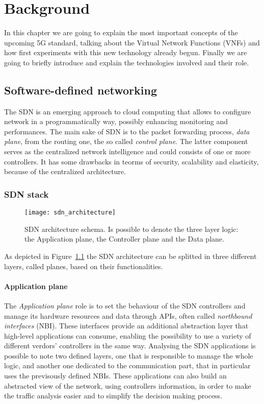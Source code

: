 \chapter{Background}
\label{chap:background}

In this chapter we are going to explain the most important concepts of the 
upcoming 5G standard, talking about the Virtual Network Functions (VNFs) and 
how first experiments with this new technology already begun. Finally we are 
going to briefly introduce and explain the technologies involved and their role.

\section{Software-defined networking}
The SDN is an emerging approach to cloud computing that allows to configure
network in a programmatically way, possibly enhancing monitoring and
performances. The main sake of SDN is to the packet forwarding process,
\emph{data plane}, from the routing one, the so called \emph{control plane}.
The latter component serves as the centralized network intelligence and could
consists of one or more controllers. It has some drawbacks in teorms of
security, scalability and elasticity, because of the centralized architecture.

\subsection{SDN stack}
\begin{figure}[t]
 \centering
 \texttt{[image: sdn\_architecture]}
 \caption[SDN architecture schema]{SDN architecture schema. Is possible to 
denote the three layer logic: the Application plane, the Controller plane and 
the Data plane.}
 \label{chap:background:img:sdn_architecture}
\end{figure}
As depicted in Figure~\ref{chap:background:img:sdn_architecture} the SDN
architecture can be splitted in three different layers, called planes, based on 
their functionalities. 

\subsubsection{Application plane}

The \emph{Application plane} role is to set the behaviour of the SDN controllers 
and manage its hardware resources and data through APIs, often called 
\emph{northbound interfaces} (NBI).
These interfaces provide an additional abstraction layer that high-level 
applications can consume, enabling the possibility to use a variety of 
different verdors' controllers in the same way.
Analysing the SDN applications is possible to note two defined layers, one that 
is responsible to manage the whole logic, and another one dedicated to the 
communication part, that in particular uses the previsously defined NBIs.
These applications can also build an abstracted view of the network, using
controllers information, in order to make the traffic analysis easier and to 
simplify the decision making process.

